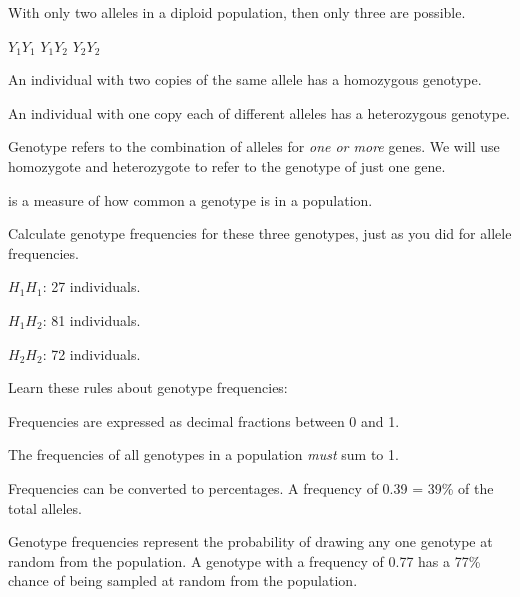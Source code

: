 \documentclass[t,handout]{beamer}  %
\begin{document}
%
\begin{frame}[t]{With only two alleles in a diploid population, then only three  are possible.}

\Large
\hfil \alert<2>{$Y_1Y_1$} \hfil \alert<3>{$Y_1Y_2$} \hfil \alert<2>{$Y_2Y_2$} \hfill

\normalsize
	\hangpara {}An individual with two copies of the same allele has a \alert<2>{homozygous} genotype.
	
	\hangpara {}An individual with one copy each of different alleles has a \alert<3>{heterozygous} genotype.
	
	\hangpara {}\textsc{} Genotype refers to the combination of alleles for \emph{one or more} genes. We will use homozygote and heterozygote to refer to the genotype of just one gene.

\end{frame}
%
\begin{frame}[t]{ is a measure of how common a genotype is in a population.}

	\hangpara Calculate genotype frequencies for these three genotypes, just as you did for allele frequencies.
	
	\hangpara \quad $H_1H_1$: 27 individuals. \onslide<2>{0.15}
	
	\hangpara \quad	$H_1H_2$: 81 individuals. \onslide<2>{0.45}
	
	\hangpara \quad $H_2H_2$: 72 individuals. \onslide<2>{0.40}

\end{frame}
%
\begin{frame}[t]{Learn these rules about genotype frequencies:}

	\hangpara Frequencies are expressed as decimal fractions between 0 and 1.
	
	\hangpara The frequencies of all genotypes in a population \emph{must} sum to 1.
	
	\hangpara Frequencies can be converted to percentages. A frequency of 0.39 = 39\% of the total alleles.
	
	\hangpara Genotype frequencies represent the probability of drawing any one genotype at random from the population. A genotype with a frequency of 0.77 has a 77\% chance of being sampled at random from the population.

\end{frame}
%
\end{document}
